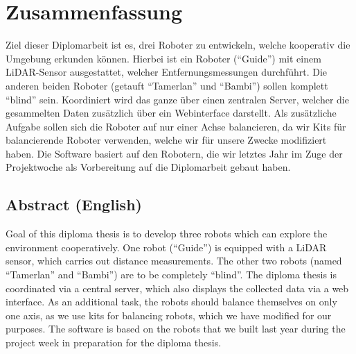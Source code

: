 
\section{Zusammenfassung}
Ziel dieser Diplomarbeit ist es, drei Roboter zu entwickeln,
welche kooperativ die Umgebung erkunden können.
%
Hierbei ist ein Roboter (``Guide'') mit einem LiDAR-Sensor ausgestattet,
welcher Entfernungsmessungen durchführt.
%
Die anderen beiden Roboter (getauft ``Tamerlan'' und ``Bambi'')
sollen komplett ``blind'' sein.
%
Koordiniert wird das ganze über einen zentralen Server,
welcher die gesammelten Daten zusätzlich über ein Webinterface darstellt.
%
Als zusätzliche Aufgabe sollen sich die Roboter auf nur einer Achse balancieren,
da wir Kits für balancierende Roboter verwenden,
welche wir für unsere Zwecke modifiziert haben.
Die Software basiert auf den Robotern,
die wir letztes Jahr im Zuge der Projektwoche als Vorbereitung auf die Diplomarbeit gebaut haben.
\subsection{Abstract (English)}
Goal of this diploma thesis is to develop three robots which
can explore the environment cooperatively.
%
One robot (``Guide'') is equipped with a LiDAR sensor,
which carries out distance measurements.
%
The other two robots (named ``Tamerlan'' and ``Bambi'')
are to be completely ``blind''.
%
The diploma thesis is coordinated via a central server,
which also displays the collected data via a web interface.
%
As an additional task, the robots should balance themselves on only one axis,
as we use kits for balancing robots,
which we have modified for our purposes.
The software is based on the robots
that we built last year during the project week in preparation for the diploma thesis.